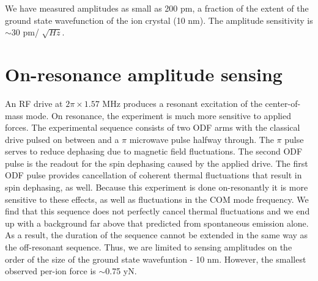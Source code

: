 \documentclass[aps,prl,twocolumn,groupedaddress]{revtex4-1}
\begin{document}
We have measured amplitudes as small as 200 pm, a fraction of the extent of the ground state wavefunction of the ion crystal (10 nm). The amplitude sensitivity is $\sim$30 pm/ $ \sqrt{Hz}$.

\section{On-resonance amplitude sensing}

An RF drive at $2\pi \times 1.57$ MHz produces a resonant excitation of the center-of-mass mode. On resonance, the experiment is much more sensitive to applied forces. The experimental sequence consists of two ODF arms with the classical drive pulsed on between and a $\pi$ microwave pulse halfway through. The $\pi$ pulse serves to reduce dephasing due to magnetic field fluctuations. The second ODF pulse is the readout for the spin dephasing caused by the applied drive. The first ODF pulse provides cancellation of coherent thermal fluctuations that result in spin dephasing, as well. Because this experiment is done on-resonantly it is more sensitive to these effects, as well as fluctuations in the COM mode frequency. We find that this sequence does not perfectly cancel thermal fluctuations and we end up with a background far above that predicted from spontaneous emission alone. As a result, the duration of the sequence cannot be extended in the same way as the off-resonant sequence. Thus, we are limited to sensing amplitudes on the order of the size of the ground state wavefuntion - 10 nm. However, the smallest observed per-ion force is $\sim$0.75 yN. 
\end{document}
